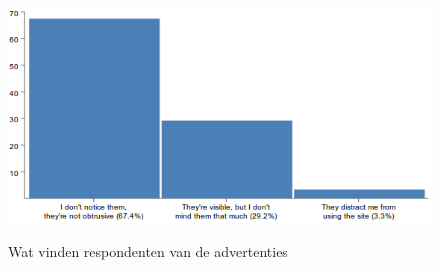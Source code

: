         \begin{figure}
          \begin{center}
          \caption{Wat vinden respondenten van de advertenties}
            \includegraphics[width=\textwidth]{../images/enquete/advertisements}
          \label{fig:advertisements}
          \end{center}
        \end{figure}

